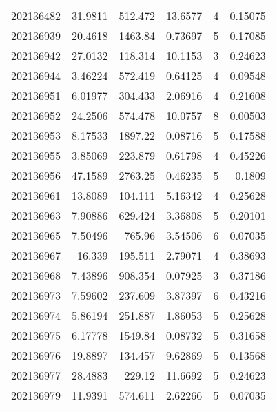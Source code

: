 \begin{tabular}{rrrrrr}
 202136482 &         31.9811  &      512.472  &           13.6577  &           4 & 0.15075 \\
 202136939 &         20.4618  &     1463.84   &            0.73697 &           5 & 0.17085 \\
 202136942 &         27.0132  &      118.314  &           10.1153  &           3 & 0.24623 \\
 202136944 &          3.46224 &      572.419  &            0.64125 &           4 & 0.09548 \\
 202136951 &          6.01977 &      304.433  &            2.06916 &           4 & 0.21608 \\
 202136952 &         24.2506  &      574.478  &           10.0757  &           8 & 0.00503 \\
 202136953 &          8.17533 &     1897.22   &            0.08716 &           5 & 0.17588 \\
 202136955 &          3.85069 &      223.879  &            0.61798 &           4 & 0.45226 \\
 202136956 &         47.1589  &     2763.25   &            0.46235 &           5 & 0.1809  \\
 202136961 &         13.8089  &      104.111  &            5.16342 &           4 & 0.25628 \\
 202136963 &          7.90886 &      629.424  &            3.36808 &           5 & 0.20101 \\
 202136965 &          7.50496 &      765.96   &            3.54506 &           6 & 0.07035 \\
 202136967 &         16.339   &      195.511  &            2.79071 &           4 & 0.38693 \\
 202136968 &          7.43896 &      908.354  &            0.07925 &           3 & 0.37186 \\
 202136973 &          7.59602 &      237.609  &            3.87397 &           6 & 0.43216 \\
 202136974 &          5.86194 &      251.887  &            1.86053 &           5 & 0.25628 \\
 202136975 &          6.17778 &     1549.84   &            0.08732 &           5 & 0.31658 \\
 202136976 &         19.8897  &      134.457  &            9.62869 &           5 & 0.13568 \\
 202136977 &         28.4883  &      229.12   &           11.6692  &           5 & 0.24623 \\
 202136979 &         11.9391  &      574.611  &            2.62266 &           5 & 0.07035 \\

\end{tabular}
